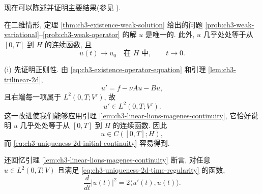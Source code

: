 现在可以陈述并证明主要结果(参见 ).

\begin{Theorem}
\label{thm:ch3-uniqueness-2d}
在二维情形, 定理 \ref{thm:ch3-existence-weak-solution} 给出的问题 \ref{prob:ch3-weak-variational}--\ref{prob:ch3-weak-operator} 的解 $u$ 是唯一的. 此外, $u$ 几乎处处等于从 $[0,T]$ 到 $H$ 的连续函数, 且
\begin{equation}
u(t)\longrightarrow u_0\quad\text{在 }H\text{ 中},
\qquad t\to0.
\label{eq:ch3-uniqueness-2d-initial-continuity}
\end{equation}
\end{Theorem}

\hypertarget{chapter-03-page-214}{}
\begin{Proof}
(i) 先证明正则性. 由 \eqref{eq:ch3-existence-operator-equation} 和引理 \ref{lem:ch3-trilinear-2d},
\[
u'=f-\nu Au-Bu,
\]
且右端每一项属于 $L^2(0,T;V')$, 故
\begin{equation}
u'\in L^2(0,T;V').
\label{eq:ch3-uniqueness-2d-time-regularity}
\end{equation}
这一改进使我们能够应用引理 \ref{lem:ch3-linear-lions-magenes-continuity}, 它恰好说明 $u$ 几乎处处等于从 $[0,T]$ 到 $H$ 的连续函数. 因此
\begin{equation}
u\in C([0,T];H),
\label{eq:ch3-uniqueness-2d-continuity}
\end{equation}
而 \eqref{eq:ch3-uniqueness-2d-initial-continuity} 容易得到.

还回忆引理 \ref{lem:ch3-linear-lions-magenes-continuity} 断言, 对任意 $u\in L^2(0,T;V)$ 且满足 \eqref{eq:ch3-uniqueness-2d-time-regularity} 的函数,
\begin{equation}
\frac d{dt}|u(t)|^2=2\langle u'(t),u(t)\rangle.
\label{eq:ch3-uniqueness-2d-energy-derivative}
\end{equation}


\end{Proof}

